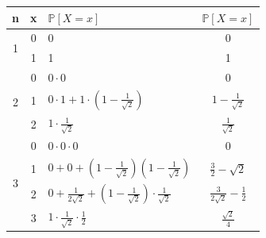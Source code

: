 \documentclass[longpaper, english, final, times]{revdetua}
\begin{document}
		{\def\arraystretch{1.4}%
			\begin{center}
				\begin{tabular}{c|c|l|c} 
					\hline
					n & x &$\mathbb{P}[X=x]$&$\mathbb{P}[X=x]$\\
					\hline
					 \multirow{2}{4em}{1}&0 &0 &0\\
					 &1&1&1\\
					 \hline
					 \multirow{3}{4em}{2}&0 &$0\cdot 0$ &0\\
					 &1&$0\cdot 1+1\cdot \left(1-\frac{1}{\sqrt{2}}\right)$&$1-\frac{1}{\sqrt{2}}$\\
					 &2&$1\cdot \frac{1}{\sqrt{2}}$&$\frac{1}{\sqrt{2}}$\\
					 \hline
					 \multirow{4}{4em}{3}&0 &$0\cdot 0\cdot0$&$0$\\
					 &1&$0+0+(1-\frac{1}{\sqrt{2}})(1-\frac{1}{\sqrt{2}})$&$\frac{3}{2}-\sqrt{2}$\\
					 &2&$0+\frac{1}{2\sqrt{2}}+\left(1-\frac{1}{\sqrt{2}}\right)\cdot \frac{1}{\sqrt{2}}$&$\frac{3}{2\sqrt{2}}-\frac{1}{2}$\\
					 &3&$1\cdot \frac{1}{\sqrt{2}}\cdot \frac{1}{2}$&$\frac{\sqrt{2}}{4}$\\
					 \hline
				\end{tabular}
			\end{center}
		}
	
\end{document}
